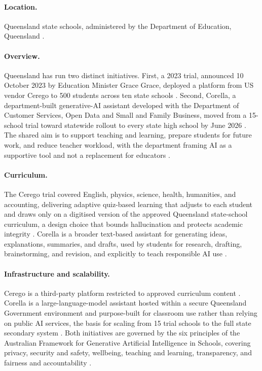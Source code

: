 \paragraph{Location.}
Queensland state schools, administered by the Department of Education, Queensland
\autocite{educationQueenslandGenerativeAI2026}.

\paragraph{Overview.}
Queensland has run two distinct initiatives. First, a 2023 trial, announced 10 October
2023 by Education Minister Grace Grace, deployed a platform from US vendor Cerego to
500 students across ten state schools \autocite{acsQueenslandTrialAI2023}. Second,
Corella, a department-built generative-AI assistant developed with the Department of
Customer Services, Open Data and Small and Family Business, moved from a 15-school
trial toward statewide rollout to every state high school by June 2026
\autocite{educationdailyCorellaRollout2025}. The shared aim is to support teaching and
learning, prepare students for future work, and reduce teacher workload, with the
department framing AI as a supportive tool and not a replacement for educators
\autocite{queenslandAITrialSchools2023}.

\paragraph{Curriculum.}
The Cerego trial covered English, physics, science, health, humanities, and
accounting, delivering adaptive quiz-based learning that adjusts to each student and
draws only on a digitised version of the approved Queensland state-school curriculum,
a design choice that bounds hallucination and protects academic integrity
\autocite{acsQueenslandTrialAI2023}. Corella is a broader text-based assistant for
generating ideas, explanations, summaries, and drafts, used by students for research,
drafting, brainstorming, and revision, and explicitly to teach responsible AI use
\autocite{educationdailyCorellaRollout2025}.

\paragraph{Infrastructure and scalability.}
Cerego is a third-party platform restricted to approved curriculum content
\autocite{acsQueenslandTrialAI2023}. Corella is a large-language-model assistant hosted
within a secure Queensland Government environment and purpose-built for classroom use
rather than relying on public AI services, the basis for scaling from 15 trial schools
to the full state secondary system \autocite{educationQueenslandCorellaTerms2026}. Both
initiatives are governed by the six principles of the Australian Framework for
Generative Artificial Intelligence in Schools, covering privacy, security and safety,
wellbeing, teaching and learning, transparency, and fairness and accountability
\autocite{queenslandAITrialSchools2023}.

